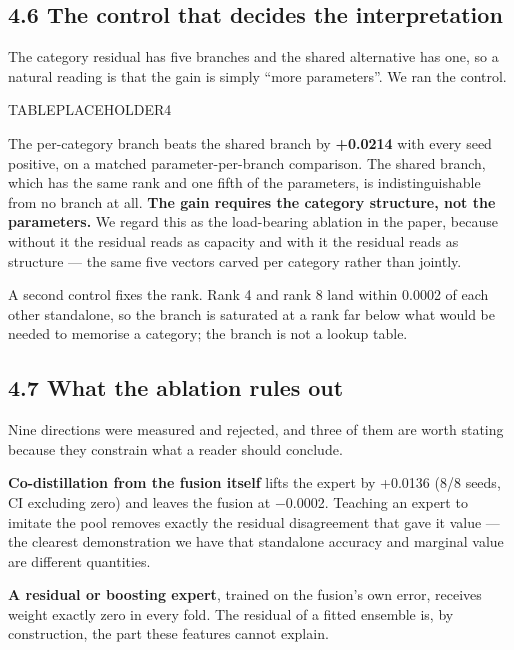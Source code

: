 \hypertarget{the-control-that-decides-the-interpretation}{%
\subsection{4.6 The control that decides the interpretation}\label{the-control-that-decides-the-interpretation}}

The category residual has five branches and the shared alternative has one, so a natural reading is that
the gain is simply ``more parameters''. We ran the control.

TABLEPLACEHOLDER4

The per-category branch beats the shared branch by \textbf{+0.0214} with every seed positive, on a matched
parameter-per-branch comparison. The shared branch, which has the same rank and one fifth of the
parameters, is indistinguishable from no branch at all. \textbf{The gain requires the category structure, not
the parameters.} We regard this as the load-bearing ablation in the paper, because without it the
residual reads as capacity and with it the residual reads as structure --- the same five vectors carved
per category rather than jointly.

A second control fixes the rank. Rank 4 and rank 8 land within 0.0002 of each other standalone, so the
branch is saturated at a rank far below what would be needed to memorise a category; the branch is not
a lookup table.

\hypertarget{what-the-ablation-rules-out}{%
\subsection{4.7 What the ablation rules out}\label{what-the-ablation-rules-out}}

Nine directions were measured and rejected, and three of them are worth stating because they constrain
what a reader should conclude.

\textbf{Co-distillation from the fusion itself} lifts the expert by +0.0136 (8/8 seeds, CI excluding zero)
and leaves the fusion at −0.0002. Teaching an expert to imitate the pool removes exactly the residual
disagreement that gave it value --- the clearest demonstration we have that standalone accuracy and
marginal value are different quantities.

\textbf{A residual or boosting expert}, trained on the fusion's own error, receives weight exactly zero in
every fold. The residual of a fitted ensemble is, by construction, the part these features cannot
explain.

